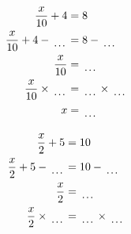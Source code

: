 \documentclass[12pt]{article}
\newcounter{minipagecount}
\begin{document}
\begin{multicols}{2}
\begin{minipage}[t]{0.45\textwidth}
    \raggedright %
    \begin{align*} %
        \frac{x}{10} + 4 &= 8\\
        \frac{x}{10} + 4 - \dotuline{\hspace{5mm}} &= 8 - \dotuline{\hspace{5mm}}\\
        \frac{x}{10} &= \dotuline{\hspace{5mm}}\\
        \frac{x}{10} \times\dotuline{\hspace{5mm}} &= \dotuline{\hspace{5mm}} \times\dotuline{\hspace{5mm}}\\
        x &= \dotuline{\hspace{5mm}}\\
    \end{align*}
\end{minipage} %
\noindent{(\theminipagecount)}\hspace{0.1mm} %
\begin{minipage}[t]{0.45\textwidth} %
    \vspace{-26pt}  %
    \raggedright %
    \begin{align*} %
        \frac{x}{2} + 5 &= 10\\
        \frac{x}{2} + 5 - \dotuline{\hspace{5mm}} &= 10 - \dotuline{\hspace{5mm}}\\
        \frac{x}{2} &= \dotuline{\hspace{5mm}}\\
        \frac{x}{2} \times\dotuline{\hspace{5mm}} &= \dotuline{\hspace{5mm}} \times\dotuline{\hspace{5mm}}\\

\end{align*}
\end{minipage}
\end{multicols}
\end{document}
